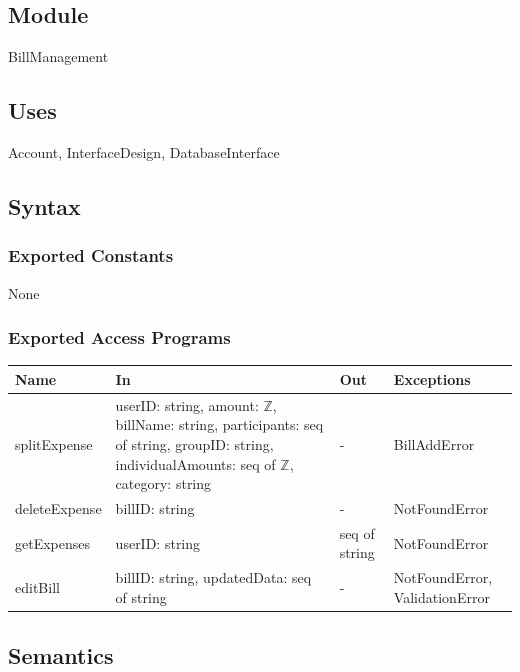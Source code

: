 \documentclass[12pt, titlepage]{article}
\begin{document}

\subsection{Module}

BillManagement


\subsection{Uses}

Account, InterfaceDesign, DatabaseInterface

\subsection{Syntax}

\subsubsection{Exported Constants}

None

\subsubsection{Exported Access Programs}

\begin{center}
\begin{tabular}{p{3cm} p{5cm} p{2cm} p{4cm}}
\hline
\textbf{Name} & \textbf{In} & \textbf{Out} & \textbf{Exceptions} \\
\hline
splitExpense & userID: string, amount: $\mathbb{Z}$, billName: string, participants: seq of string, groupID: string, individualAmounts: seq of $\mathbb{Z}$, category: string & - & BillAddError \\
\hline
deleteExpense & billID: string & - & NotFoundError \\
\hline
getExpenses & userID: string & seq of string & NotFoundError\\
\hline
editBill & billID: string, updatedData: seq of string & - & NotFoundError, ValidationError \\
\hline
\end{tabular}
\end{center}

\subsection{Semantics}
\end{document}

